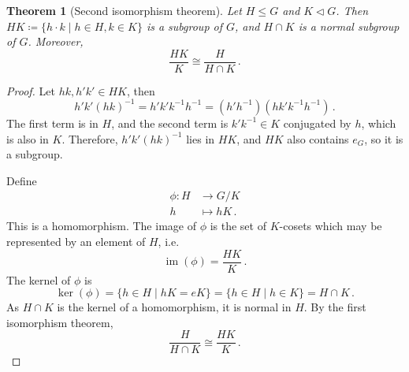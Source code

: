 \documentclass{article}
\theoremstyle{plain}\theoremheaderfont{\normalfont\itshape}\theorembodyfont{\rmfamily}\theoremseparator{.}\newtheorem*{rem}{Remark}\newtheorem*{ex}{Example}\newtheorem*{proof}{Proof}\newtheorem*{altp}{Alternative proof}\newtheorem*{nonex}{Non-Example}
\theoremstyle{plain}\theoremheaderfont{\normalfont\bfseries}\theorembodyfont{\rmfamily}\theoremseparator{.}\newtheorem{thm}{Theorem}[section]\newtheorem{lem}[thm]{Lemma}\newtheorem{prop}[thm]{Proposition}\newtheorem*{cor}{Corollary}\newtheorem{defn}[thm]{Definition}\newtheorem{clm}[thm]{Claim}\newtheorem{clminproof}{Claim}\newtheorem*{notn}{Notation}\newtheorem*{exer}{Exercise}\newtheorem*{lemnn}{Lemma}
\theoremstyle{break}\theoremheaderfont{\normalfont\itshape}\theorembodyfont{\rmfamily}\theoremseparator{.\medskip}\newtheorem*{proofskip}{Proof}\newtheorem*{exs}{Examples}\newtheorem*{rems}{Remarks}\newtheorem*{obs}{Observations}
\theoremstyle{break}\theoremheaderfont{\normalfont\bfseries}\theorembodyfont{\rmfamily}\theoremseparator{.\medskip}\newtheorem{lemskip}[thm]{Lemma}\newtheorem{defnskip}[thm]{Definition}\newtheorem{propskip}[thm]{Proposition}\newtheorem{thmskip}[thm]{Theorem}
\numberwithin{equation}{section}
\DeclareMathOperator*{\im}{im}
\begin{document}
    \begin{thm}[Second isomorphism theorem]
        Let \(H\le G\) and \(K\lhd G\). Then \(HK\coloneqq\{h\cdot k\mid h\in H,k\in K\}\) is a subgroup of \(G\), and \(H\cap K\) is a normal subgroup of \(G\). Moreover,
        \[\frac{HK}{K}\cong\frac{H}{H\cap K}\,.\]
    \end{thm}
    \begin{proof}
        Let \(hk,h'k'\in HK\), then
        \[h'k'(hk)^{-1}=h'k'k^{-1}h^{-1}=(h'h^{-1})(hk'k^{-1}h^{-1})\,.\]
        The first term is in \(H\), and the second term is \(k'k^{-1}\in K\) conjugated by \(h\), which is also in \(K\). Therefore, \(h'k'(hk)^{-1}\) lies in \(HK\), and \(HK\) also contains \(e_G\), so it is a subgroup.

        Define
        \begin{align*}
            \phi:H&\longrightarrow G/K\\
            h&\longmapsto hK\,.
        \end{align*}
        This is a homomorphism. The image of \(\phi\) is the set of \(K\)-cosets which may be represented by an element of \(H\), i.e.
        \[\im(\phi)=\frac{HK}{K}\,.\]
        The kernel of \(\phi\) is
        \[\ker(\phi)=\{h\in H\mid hK=eK\}=\{h\in H\mid h\in K\}=H\cap K\,.\]
        As \(H\cap K\) is the kernel of a homomorphism, it is normal in \(H\). By the first isomorphism theorem,
        \[\frac{H}{H\cap K}\cong\frac{HK}{K}\,.\]
    \end{proof}
\end{document}
